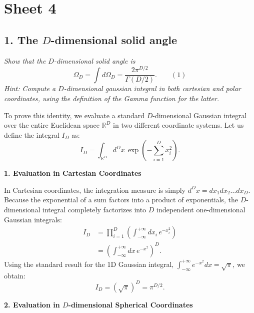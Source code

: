 \section*{Sheet 4}


\subsection*{1. The $D$-dimensional solid angle}

\begin{center}
    \textit{Show that the $D$-dimensional solid angle is}
    \[
        \Omega_D = \int d\Omega_D = \frac{2\pi^{D/2}}{\Gamma(D/2)}. \qquad (1)
    \]
    \textit{Hint: Compute a $D$-dimensional gaussian integral in both cartesian and polar coordinates, using the definition of the Gamma function for the latter.}
\end{center}

To prove this identity, we evaluate a standard $D$-dimensional Gaussian integral over the entire Euclidean space $\mathbb{R}^D$ in two different coordinate systems. Let us define the integral $I_D$ as:
\[
    I_D = \int_{\mathbb{R}^D} d^Dx \, \exp\left(-\sum_{i=1}^D x_i^2\right).
\]

\textbf{1. Evaluation in Cartesian Coordinates}

In Cartesian coordinates, the integration measure is simply $d^Dx = dx_1 dx_2 \dots dx_D$. Because the exponential of a sum factors into a product of exponentials, the $D$-dimensional integral completely factorizes into $D$ independent one-dimensional Gaussian integrals:
\[
    \begin{aligned}
        I_D & = \prod_{i=1}^D \left( \int_{-\infty}^{+\infty} dx_i \, e^{-x_i^2} \right) \\
            & = \left( \int_{-\infty}^{+\infty} dx \, e^{-x^2} \right)^D.
    \end{aligned}
\]
Using the standard result for the 1D Gaussian integral, $\int_{-\infty}^{+\infty} e^{-x^2} dx = \sqrt{\pi}$, we obtain:
\[
    I_D = (\sqrt{\pi})^D = \pi^{D/2}.
\]

\textbf{2. Evaluation in $D$-dimensional Spherical Coordinates}

